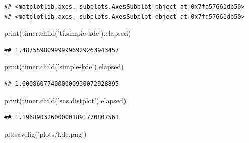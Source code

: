 \documentclass[
  12pt,
  english,
  a4paper,
,tablecaptionabove
]{scrartcl}
\newenvironment{Shaded}{\begin{snugshade}}{\end{snugshade}}
\newcommand{\BuiltInTok}[1]{#1}
\newcommand{\NormalTok}[1]{#1}
\newcommand{\StringTok}[1]{\textcolor[rgb]{0.31,0.60,0.02}{#1}}
\begin{document}
\begin{verbatim}
## <matplotlib.axes._subplots.AxesSubplot object at 0x7fa57661db50>
## <matplotlib.axes._subplots.AxesSubplot object at 0x7fa57661db50>
\end{verbatim}

\begin{Shaded}
\begin{Highlighting}[]
\BuiltInTok{print}\NormalTok{(timer.child(}\StringTok{'tf.simple-kde'}\NormalTok{).elapsed)}
\end{Highlighting}
\end{Shaded}

\begin{verbatim}
## 1.487559809999996929263943457
\end{verbatim}

\begin{Shaded}
\begin{Highlighting}[]
\BuiltInTok{print}\NormalTok{(timer.child(}\StringTok{'simple-kde'}\NormalTok{).elapsed)}
\end{Highlighting}
\end{Shaded}

\begin{verbatim}
## 1.600860774000000930072928895
\end{verbatim}

\begin{Shaded}
\begin{Highlighting}[]
\BuiltInTok{print}\NormalTok{(timer.child(}\StringTok{'sns.distplot'}\NormalTok{).elapsed)}
\end{Highlighting}
\end{Shaded}

\begin{verbatim}
## 1.196890326000001891770807561
\end{verbatim}

\begin{Shaded}
\begin{Highlighting}[]
\NormalTok{plt.savefig(}\StringTok{'plots/kde.png'}\NormalTok{)}
\end{Highlighting}
\end{Shaded}
\end{document}
